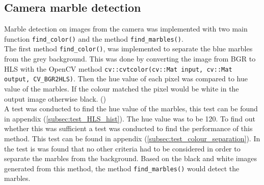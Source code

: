 \documentclass[../Head/Main.tex]{subfiles}
\begin{document}
\subsection{Camera marble detection}
Marble detection on images from the camera was implemented with two main function \texttt{find\_color()} and the method \texttt{find\_marbles()}.\\
The first method \texttt{find\_color()}, was implemented to separate the blue marbles from the grey background. This was done by converting the image from BGR to HLS with the OpenCV method \texttt{cv::cvtcolor(cv::Mat input, cv::Mat output, CV\_BGR2HLS)}. Then the hue value of each pixel was compared to hue value of the marbles. If the colour matched the pixel would be white in the output image otherwise black. (\cite[18-20]{OCV})\\
A test was conducted to find the hue value of the marbles, this test can be found in appendix (\ref{subsec:test_HLS_hist}). The hue value was to be 120. To find out whether this was sufficient a test was conducted to find the performance of this method. This test can be found in appendix (\ref{subsec:test_colour_separation}). In the test is was found that no other criteria had to be considered in order to separate the marbles from the background. Based on the black and white images generated from this method, the method \texttt{find\_marbles()} would detect the marbles.\par 
\end{document}
